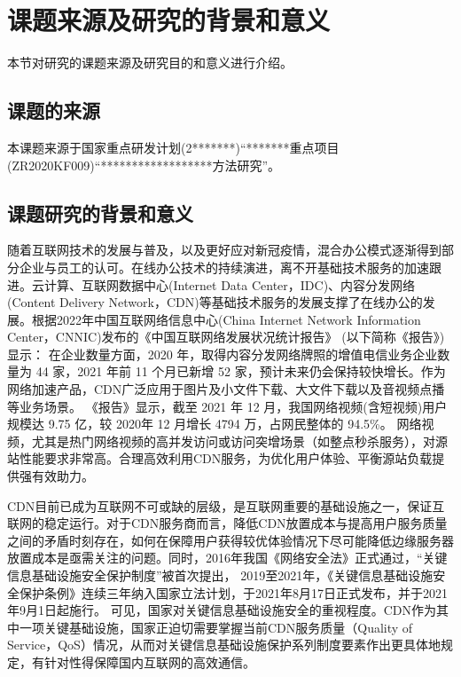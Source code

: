
\section{课题来源及研究的背景和意义}
	本节对研究的课题来源及研究目的和意义进行介绍。
\subsection{课题的来源}
本课题来源于国家重点研发计划(2*******)“*******重点项目(ZR2020KF009)“******************方法研究”。
\subsection{课题研究的背景和意义}

随着互联网技术的发展与普及，以及更好应对新冠疫情，混合办公模式逐渐得到部分企业与员工的认可。在线办公技术的持续演进，离不开基础技术服务的加速跟进。云计算、互联网数据中心(Internet Data Center，IDC)、内容分发网络(Content Delivery Network，CDN)等基础技术服务的发展支撑了在线办公的发展。根据2022年中国互联网络信息中心(China Internet Network Information Center，CNNIC)发布的《中国互联网络发展状况统计报告》\cite{cnnic2022} (以下简称《报告》)显示：
在企业数量方面，2020 年，取得内容分发网络牌照的增值电信业务企业数量为 44 家，2021 年前 11 个月已新增 52 家，预计未来仍会保持较快增长。作为网络加速产品，CDN广泛应用于图片及小文件下载、大文件下载以及音视频点播等业务场景。
《报告》显示，截至 2021 年 12 月，我国网络视频(含短视频)用户规模达 9.75 亿，较 2020年 12 月增长 4794 万，占网民整体的 94.5\%。
网络视频，尤其是热门网络视频的高并发访问或访问突增场景（如整点秒杀服务），对源站性能要求非常高。合理高效利用CDN服务，为优化用户体验、平衡源站负载提供强有效助力。

CDN目前已成为互联网不可或缺的层级，是互联网重要的基础设施之一，保证互联网的稳定运行。对于CDN服务商而言，降低CDN放置成本与提高用户服务质量之间的矛盾时刻存在，如何在保障用户获得较优体验情况下尽可能降低边缘服务器放置成本是亟需关注的问题。同时，2016年我国《网络安全法》正式通过，“关键信息基础设施安全保护制度”被首次提出，
2019至2021年，《关键信息基础设施安全保护条例》连续三年纳入国家立法计划，于2021年8月17日正式发布，并于2021年9月1日起施行。
可见，国家对关键信息基础设施安全的重视程度。CDN作为其中一项关键基础设施，国家正迫切需要掌握当前CDN服务质量（Quality of
Service，QoS）情况，从而对关键信息基础设施保护系列制度要素作出更具体地规定，有针对性得保障国内互联网的高效通信。



